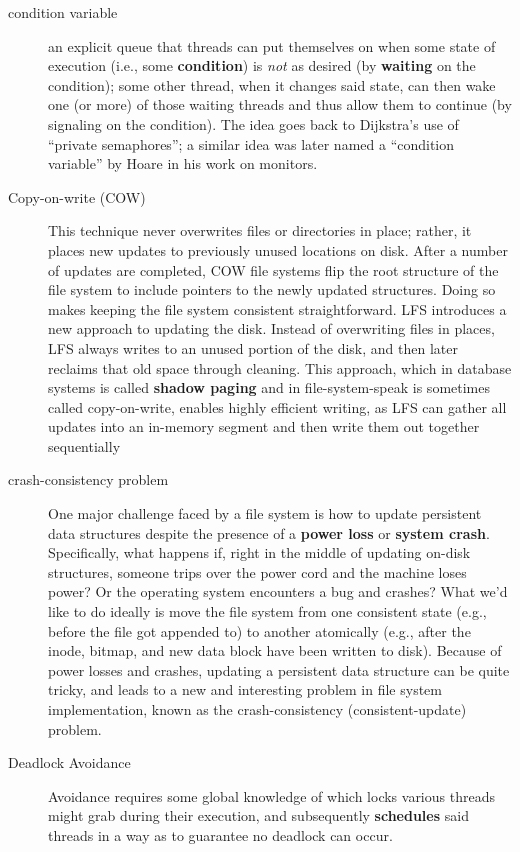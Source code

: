 \begin{description}
\item[condition variable] an explicit queue that threads can put themselves on when some state of execution (i.e., some \textbf{condition}) is \emph{not} as desired (by \textbf{waiting} on the condition); some other thread, when it changes said state, can then wake one (or more) of those waiting threads and thus allow them to continue (by signaling on the condition). The idea goes back to Dijkstra's use of ``private semaphores''; a similar idea was later named a ``condition variable'' by Hoare in his work on monitors.

\item[Copy-on-write (COW)] This technique never overwrites files or directories in place; rather, it places new updates to previously unused locations on disk. After a number of updates are completed, COW file systems flip the root structure of the file system to include pointers to the newly updated structures. Doing so makes keeping the file system consistent straightforward.  LFS introduces a new approach to updating the disk. Instead of overwriting files in places, LFS always writes to an unused portion of the disk, and then later reclaims that old space through cleaning. This approach, which in database systems is called \textbf{shadow paging} and in file-system-speak is sometimes called copy-on-write, enables highly efficient writing, as LFS can gather all updates into an in-memory segment and then write them out together sequentially

\item[crash-consistency problem] One major challenge faced by a file system is how to update persistent data structures despite the presence of a \textbf{power loss} or \textbf{system crash}. Specifically, what happens if, right in the middle of updating on-disk structures, someone trips over the power cord and the machine loses power? Or the operating system encounters a bug and crashes? What we’d like to do ideally is move the file system from one consistent state (e.g., before the file got appended to) to another atomically (e.g., after the inode, bitmap, and new data block have been written to disk). Because of power losses and crashes, updating a persistent data structure can be quite tricky, and leads to a new and interesting problem in file system implementation, known as the crash-consistency (consistent-update) problem.

\item[Deadlock Avoidance] Avoidance requires some global knowledge of which locks various threads might grab during their execution, and subsequently \textbf{schedules} said threads in a way as to guarantee no deadlock can occur.


\end{description}
